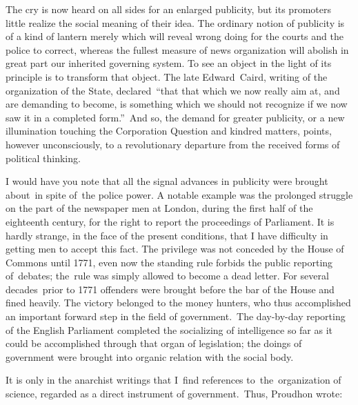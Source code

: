 \documentclass[twoside,symmetric,nobib,justified]{tufte-book}
\begin{document}
The cry is now heard on all sides for an enlarged publicity, but its
promoters little realize the social meaning of their idea. The ordinary
notion of publicity is of a kind of lantern merely which will reveal
wrong doing for the courts and the police to correct, whereas the
fullest measure of news organization will abolish in great part our
inherited governing system. To see an object in the light of its
principle is to transform that object. The late Edward~Caird, writing of
the organization of the State, declared~``that that which we now really
aim at, and are demanding to become, is something which we should not
recognize if we now saw it in a completed form.''~And so, the demand for
greater publicity, or a new illumination touching the Corporation
Question and kindred matters, points, however unconsciously, to a
revolutionary departure from the received forms of political thinking.~

I would have you note that all the signal advances in publicity were
brought about~in spite of~the police power. A notable example was the
prolonged struggle on the part of the newspaper men at London, during
the first half of the eighteenth century, for the right to report the
proceedings of Parliament. It is hardly strange, in the face of the
present conditions, that I have difficulty in getting men to accept this
fact. The privilege was not conceded by the House of Commons until 1771,
even now the standing rule forbids the public reporting of~debates;
the~rule was simply allowed to become a dead letter. For several
decades~prior to 1771 offenders were brought before the bar of the House
and fined heavily. The victory belonged to the money hunters, who thus
accomplished an important forward step in the field of government.~The
day-by-day reporting of the English Parliament completed the socializing
of intelligence so far as it could be accomplished through that organ of
legislation; the doings of government were brought into organic relation
with the social body.~

It is only in the anarchist writings that I~find references
to~the~organization of science, regarded as a direct instrument of
government.~Thus, Proudhon wrote:~
\end{document}
